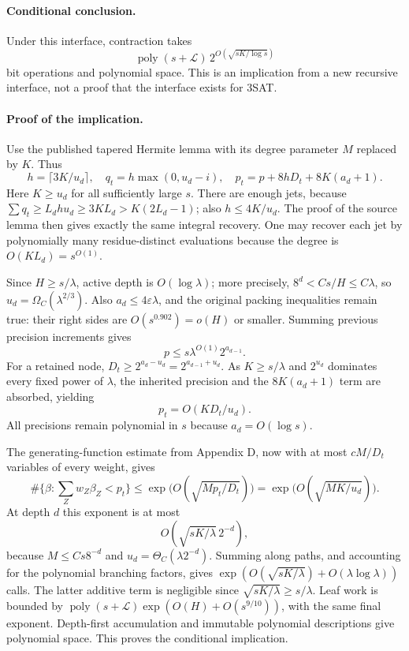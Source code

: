\paragraph{Conditional conclusion.}
Under this interface, contraction takes
\[
 \operatorname{poly}(s+\mathcal L)\,
 2^{O(\sqrt{sK/\log s})}
\]
bit operations and polynomial space. This is an implication from a new
recursive interface, not a proof that the interface exists for 3SAT.

\paragraph{Proof of the implication.}
Use the published tapered Hermite lemma with its degree parameter $M$
replaced by $K$. Thus
\[
 h=\lceil3K/u_d\rceil,\quad q_t=h\max(0,u_d-i),\quad
 p_t=p+8hD_t+8K(a_d+1).
\]
Here $K\ge u_d$ for all sufficiently large $s$. There are enough jets,
because $\sum q_t\ge L_dhu_d\ge3KL_d>K(2L_d-1)$; also $h\le4K/u_d$.
The proof of the source lemma then gives exactly the same integral recovery.
One may recover each jet by polynomially many residue-distinct evaluations
because the degree is $O(KL_d)=s^{O(1)}$.

Since $H\ge s/\lambda$, active depth is $O(\log\lambda)$; more precisely,
$8^d<Cs/H\le C\lambda$, so $u_d=\Omega_C(\lambda^{2/3})$.
Also $a_d\le4\varepsilon\lambda$, and the original packing inequalities
remain true: their right sides are $O(s^{0.902})=o(H)$ or smaller.
Summing previous precision increments gives
\[
 p\le s\lambda^{O(1)}2^{a_{d-1}}.
\]
For a retained node,
$D_t\ge2^{a_d-u_d}=2^{a_{d-1}+u_d}$.
As $K\ge s/\lambda$ and $2^{u_d}$ dominates every fixed power of $\lambda$,
the inherited precision and the $8K(a_d+1)$ term are absorbed, yielding
\[
 p_t=O(KD_t/u_d).
\]
All precisions remain polynomial in $s$ because $a_d=O(\log s)$.

The generating-function estimate from Appendix D, now with at most $cM/D_t$
variables of every weight, gives
\[
 \#\{\beta:\sum_Zw_Z\beta_Z<p_t\}
 \le \exp\bigl(O(\sqrt{Mp_t/D_t})\bigr)
 =\exp\bigl(O(\sqrt{MK/u_d})\bigr).
\]
At depth $d$ this exponent is at most
\[
 O\!\left(\sqrt{sK/\lambda}\,2^{-d}\right),
\]
because $M\le Cs8^{-d}$ and $u_d=\Theta_C(\lambda2^{-d})$.
Summing along paths, and accounting for the polynomial branching factors,
gives $\exp(O(\sqrt{sK/\lambda})+O(\lambda\log\lambda))$ calls.
The latter additive term is negligible since $\sqrt{sK/\lambda}\ge s/\lambda$.
Leaf work is bounded by $\operatorname{poly}(s+\mathcal L)
\exp(O(H)+O(s^{9/10}))$, with the same final exponent.
Depth-first accumulation and immutable polynomial descriptions give
polynomial space. This proves the conditional implication.

